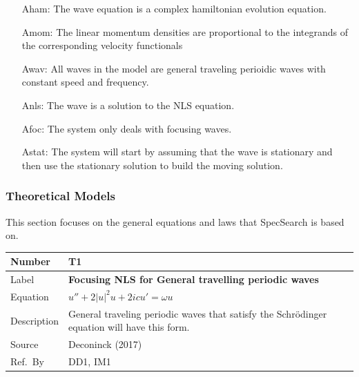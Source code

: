 \documentclass[12pt]{article}
\newcommand{\colAwidth}{0.13\textwidth}
\newcommand{\colBwidth}{0.82\textwidth}
\begin{document}
\begin{itemize}[leftmargin=.5in]

\item[Aham:]The 
wave equation is a complex hamiltonian evolution equation. 
\item[Amom:]The 
linear momentum densities are proportional to the integrands of the 
corresponding velocity functionals 
\item[Awav:]All 
waves in the model are general traveling perioidic waves with constant speed 
and frequency. 
\item[Anls:]The 
wave is a solution to the NLS equation.
\item[Afoc:]The 
system only deals with focusing waves.
\item[Astat:] The system will start by assuming that the wave is stationary and 
then use 
the stationary solution to build the moving solution.

\end{itemize}

\subsubsection{Theoretical Models}\label{sec_theoretical}

This section focuses on the general equations and laws that SpecSearch is based
on. 
~\newline

\noindent
\begin{minipage}{\textwidth}
	\renewcommand*{\arraystretch}{1.5}
	\begin{tabular}{| p{\colAwidth} | p{\colBwidth}|}
		\hline
		\rowcolor[gray]{0.9}
		Number& T1\\
		\hline
		Label&\bf Focusing NLS for General travelling periodic waves\\
		\hline
		Equation&  $ u'' + 2|u|^{2}u+2icu'=\omega u$\\
		\hline
		Description & 
		General traveling periodic waves that satisfy the Schr\"{o}dinger 
		equation 
		will have this form. \\
		\hline
		Source &
		Deconinck (2017)\\
		\hline
		Ref.\ By & DD1, IM1\\
		\hline
	\end{tabular}
\end{minipage}\\ 
\end{document}
